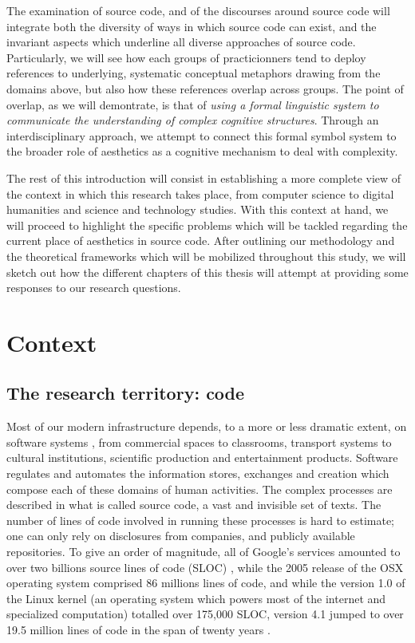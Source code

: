 The examination of source code, and of the discourses around source code will integrate both the diversity of ways in which source code can exist, and the invariant aspects which underline all diverse approaches of source code. Particularly, we will see how each groups of practicionners tend to deploy references to underlying, systematic conceptual metaphors drawing from the domains above, but also how these references overlap across groups. The point of overlap, as we will demontrate, is that of \emph{using a formal linguistic system to communicate the understanding of complex cognitive structures}. Through an interdisciplinary approach, we attempt to connect this formal symbol system to the broader role of aesthetics as a cognitive mechanism to deal with complexity.

The rest of this introduction will consist in establishing a more complete view of the context in which this research takes place, from computer science to digital humanities and science and technology studies. With this context at hand, we will proceed to highlight the specific problems which will be tackled regarding the current place of aesthetics in source code. After outlining our methodology and the theoretical frameworks which will be mobilized throughout this study, we will sketch out how the different chapters of this thesis will attempt at providing some responses to our research questions.

\section{Context}

\subsection{The research territory: code}

Most of our modern infrastructure depends, to a more or less dramatic extent, on software systems \citep{kitchin_code_2011}, from commercial spaces to classrooms, transport systems to cultural institutions, scientific production and entertainment products. Software regulates and automates the information stores, exchanges and creation which compose each of these domains of human activities.  The complex processes are described in what is called source code, a vast and invisible set of texts. The number of lines of code involved in running these processes is hard to estimate; one can only rely on disclosures from companies, and publicly available repositories. To give an order of magnitude, all of Google's services amounted to over two billions source lines of code (SLOC) \citep{scale_why_2015}, while the 2005 release of the OSX operating system comprised 86 millions lines of code, and while the version 1.0 of the Linux kernel (an operating system which powers most of the internet and specialized computation) totalled over 175,000 SLOC, version 4.1 jumped to over 19.5 million lines of code in the span of twenty years \citep{wikipedia_linux_2021}.

